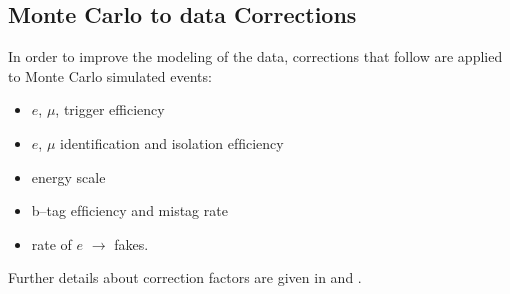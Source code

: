 \subsection{Monte Carlo to data Corrections}
\label{sec:scaleFactors}
In order to improve the modeling of the data, corrections that follow are
 applied  to Monte Carlo simulated events:
\begin{itemize}
\item $e$, $\mu$, \Tau trigger efficiency
\item $e$, $\mu$ identiﬁcation and isolation efﬁciency
\item \Tau energy scale
\item b–tag efﬁciency and mistag rate
\item rate of $e$ $\rightarrow$ \Tau  fakes.
\end{itemize}
Further details about correction factors  are given in \cite{CMS_AN_2013-171} and \cite{HiggsTauTautwiki}.
